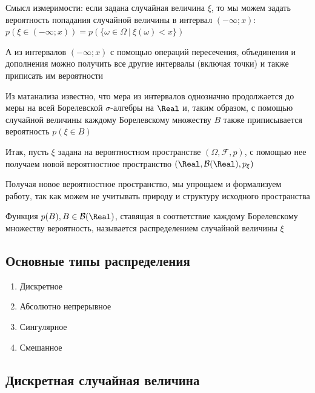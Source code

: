 \documentclass[12pt]{article}
\begin{document}
    \Nota Смысл измеримости: если задана случайная величина $\xi$, то мы можем задать вероятность попадания случайной
    величины в интервал $(-\infty; x)$: $p(\xi \in (-\infty; x)) = p(\{\omega \in \Omega \ | \ \xi(\omega) < x\})$

    А из интервалов $(-\infty; x)$ с помощью операций пересечения, объединения и дополнения можно получить все другие
    интервалы (включая точки) и также приписать им вероятности

    Из матанализа известно, что мера из интервалов однозначно продолжается до меры на всей Борелевской $\sigma$-алгебры на $\Real$
    и, таким образом, с помощью случайной величины каждому Борелевскому множеству $B$ также приписывается вероятность $p(\xi \in B)$

    \hypertarget{probabilityspacerbp}{}

    Итак, пусть $\xi$ задана на вероятностном пространстве $(\Omega, \mathcal{F}, p)$, с помощью нее получаем новой вероятностное
    пространство $(\Real, \mathcal{B}(\Real), p_\xi)$

    Получая новое вероятностное пространство, мы упрощаем и формализуем работу, так как можем не учитывать природу и структуру исходного пространства

    \hypertarget{randomvaluedistribution}{}

    \Def Функция $p(B), B \in \mathcal{B}(\Real)$, ставящая в соответствие каждому Борелевскому множеству вероятность,
    называется распределением случайной величины $\xi$

    \subsection{Основные типы распределения}

    \begin{enumerate}[label=\alph*) ]
        \item Дискретное

        \item Абсолютно непрерывное

        \item Сингулярное

        \item Смешанное
    \end{enumerate}

    \subsection{Дискретная случайная величина}
\end{document}
